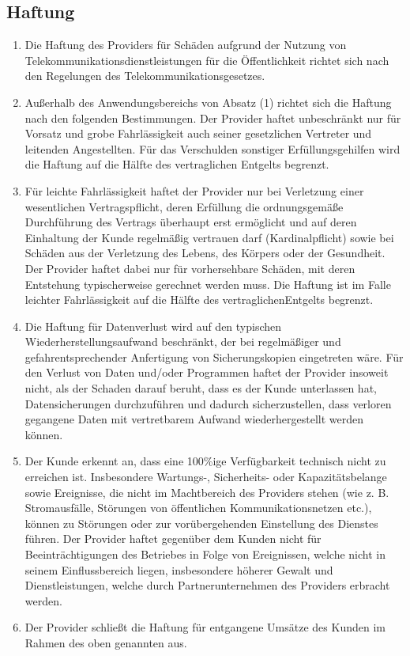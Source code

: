 \documentclass{terms}
\begin{document}
\subsection{Haftung}
\begin{enumerate}
\item Die Haftung des Providers für Schäden aufgrund der Nutzung von Telekommunikationsdienstleistungen für die Öffentlichkeit richtet sich nach den Regelungen des Telekommunikationsgesetzes.
\item Außerhalb des Anwendungsbereichs von Absatz (1) richtet sich die Haftung nach den folgenden Bestimmungen.
      Der Provider haftet unbeschränkt nur für Vorsatz und grobe Fahrlässigkeit auch seiner gesetzlichen Vertreter und leitenden Angestellten.
      Für das Verschulden sonstiger Erfüllungsgehilfen wird die Haftung auf die Hälfte des vertraglichen Entgelts begrenzt.
\item Für leichte Fahrlässigkeit haftet der Provider nur bei Verletzung einer wesentlichen Vertragspflicht, deren Erfüllung die ordnungsgemäße Durchführung des Vertrags überhaupt erst ermöglicht und auf deren Einhaltung der Kunde regelmäßig vertrauen darf (Kardinalpflicht) sowie bei Schäden aus der Verletzung des Lebens, des Körpers oder der Gesundheit.
      Der Provider haftet dabei nur für vorhersehbare Schäden, mit deren Entstehung typischerweise gerechnet werden muss.
      Die Haftung ist im Falle leichter Fahrlässigkeit auf die Hälfte des vertraglichenEntgelts begrenzt.
\item Die Haftung für Datenverlust wird auf den typischen Wiederherstellungsaufwand beschränkt, der bei regelmäßiger und gefahrentsprechender Anfertigung von Sicherungskopien eingetreten wäre.
      Für den Verlust von Daten und/oder Programmen haftet der Provider insoweit nicht, als der Schaden darauf beruht, dass es der Kunde unterlassen hat, Datensicherungen durchzuführen und dadurch sicherzustellen, dass verloren gegangene Daten mit vertretbarem Aufwand wiederhergestellt werden können.
\item Der Kunde erkennt an, dass eine 100\%ige Verfügbarkeit technisch nicht zu erreichen ist.
      Insbesondere Wartungs-, Sicherheits- oder Kapazitätsbelange sowie Ereignisse, die nicht im Machtbereich des Providers stehen (wie z. B. Stromausfälle, Störungen von öffentlichen Kommunikationsnetzen etc.), können zu Störungen oder zur vorübergehenden Einstellung des Dienstes führen.
      Der Provider haftet gegenüber dem Kunden nicht für Beeinträchtigungen des Betriebes in Folge von Ereignissen, welche nicht in seinem Einflussbereich liegen, insbesondere höherer Gewalt und Dienstleistungen, welche durch Partnerunternehmen des Providers erbracht werden.
\item Der Provider schließt die Haftung für entgangene Umsätze des Kunden im Rahmen des oben genannten aus.
\end{enumerate}
\end{document}

